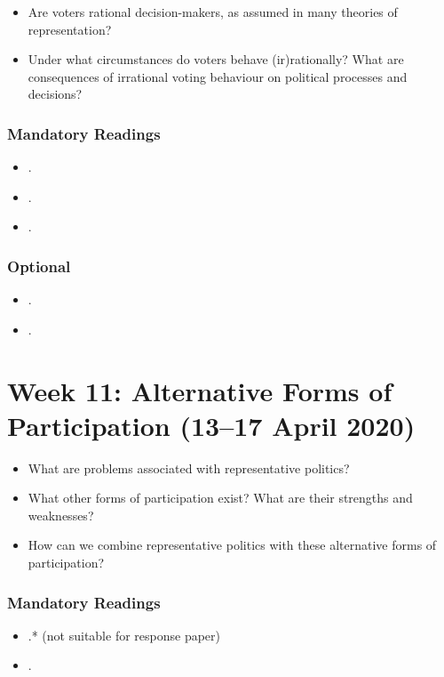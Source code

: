 \documentclass[abstract=on,parskip=full,headings=standardclasses,fontsize=11pt,paper=a4]{scrartcl}
\begin{document}
\begin{itemize}
\renewcommand\labelitemi{--}
\item Are voters rational decision-makers, as assumed in many theories of representation? 
\item Under what circumstances do voters behave (ir)rationally? What are consequences of irrational voting behaviour on political processes and decisions?
\end{itemize}


\subsubsection*{Mandatory Readings}


 \begin{itemize}
\item {}.
\item {}.
\item {}.
\end{itemize}

\subsubsection*{Optional}
\begin{itemize}
\item {}.
\item {}.
\end{itemize}



\section{Week 11: Alternative Forms of Participation (13--17 April 2020)}

\begin{itemize}
\renewcommand\labelitemi{--}
\item What are problems associated with representative politics?
\item What other forms of participation exist? What are their strengths and weaknesses?
\item How can we combine representative politics with these alternative forms of participation?
\end{itemize}

\subsubsection*{Mandatory Readings}
\begin{itemize}
\item {}.* (not suitable for response paper)
\item {}.
\end{itemize}
\end{document}
